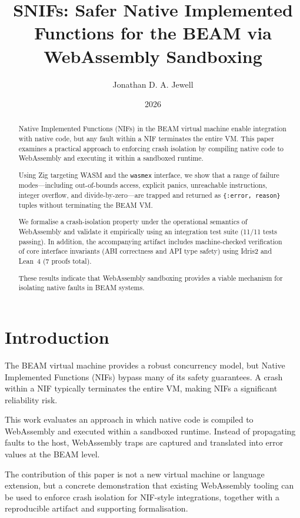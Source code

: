 \documentclass{article}
\title{SNIFs: Safer Native Implemented Functions for the BEAM via WebAssembly Sandboxing}
\author{Jonathan D. A. Jewell}
\date{2026}
\begin{document}
\maketitle

\begin{abstract}
Native Implemented Functions (NIFs) in the BEAM virtual machine enable integration with native code, but any fault within a NIF terminates the entire VM. This paper examines a practical approach to enforcing crash isolation by compiling native code to WebAssembly and executing it within a sandboxed runtime.

Using Zig targeting WASM and the \texttt{wasmex} interface, we show that a range of failure modes—including out-of-bounds access, explicit panics, unreachable instructions, integer overflow, and divide-by-zero—are trapped and returned as \texttt{\{:error, reason\}} tuples without terminating the BEAM VM.

We formalise a crash-isolation property under the operational semantics of WebAssembly and validate it empirically using an integration test suite (11/11 tests passing). In addition, the accompanying artifact includes machine-checked verification of core interface invariants (ABI correctness and API type safety) using Idris2 and Lean~4 (7 proofs total).

These results indicate that WebAssembly sandboxing provides a viable mechanism for isolating native faults in BEAM systems.
\end{abstract}

\section{Introduction}

The BEAM virtual machine provides a robust concurrency model, but Native Implemented Functions (NIFs) bypass many of its safety guarantees. A crash within a NIF typically terminates the entire VM, making NIFs a significant reliability risk.

This work evaluates an approach in which native code is compiled to WebAssembly and executed within a sandboxed runtime. Instead of propagating faults to the host, WebAssembly traps are captured and translated into error values at the BEAM level.

The contribution of this paper is not a new virtual machine or language extension, but a concrete demonstration that existing WebAssembly tooling can be used to enforce crash isolation for NIF-style integrations, together with a reproducible artifact and supporting formalisation.
\end{document}
